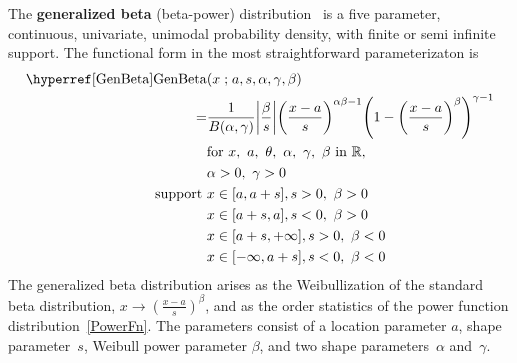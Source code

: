 


\label{sec:GenBeta}
{} 

The {\bf generalized beta} (beta-power)  distribution~\cite{McDonald1984} is a five parameter,  continuous, univariate, unimodal probability density, with finite or semi infinite support. The functional form in the most straightforward parameterizaton is
\begin{align}
\label{GenBeta}
\opr{GenBeta}&(x\given a,s,\alpha, \gamma,\beta) 
\\    = & 
 \frac{1}{B(\alpha, \gamma)} \Left|\frac{\beta}{s}\Right|
\Left(\frac{x-a}{s} \Right)^{\alpha \beta -1} \Left (1-\Left(\frac{x-a}{s}\Right)^\beta\Right)^{\gamma -1}
\notag
\checked
\\
& \text{for } x,\ a,\ \theta,\ \alpha,\ \gamma,\ \beta\  \text{in } \mathbb{R}, 
\notag
\\ & \alpha>0, \  \gamma >0
\notag
 \\ \text{ support } \checked & x \in [a,a+s], s>0,\ \beta>0 \notag
  \\  &  x\in[a+s,a], s<0,\ \beta>0 
 \notag 
 \\  \notag  &  x\in[a+s,+\infty], s>0,\ \beta<0 
 \\  \notag  &  x\in[-\infty,a+s], s<0,\ \beta<0 
\notag
\end{align}
The generalized beta distribution arises as the Weibullization of the standard beta distribution, $x\rightarrow (\tfrac{x-a}{s})^{\beta}$, and as the order statistics of the power function distribution~\eqref{PowerFn}. The parameters consist of a location parameter $a$, shape parameter~$s$, Weibull power parameter $\beta$, and two shape parameters~$\alpha$ and~$\gamma$.




